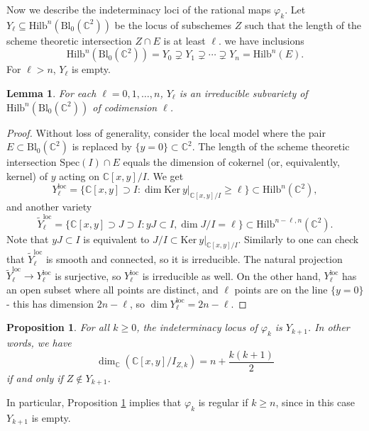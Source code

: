 \documentclass[12pt]{amsart}
\newcommand{\Hilb}{\mathrm{Hilb}}
\newcommand{\C}{\mathbb{C}}
\newcommand{\Ker}{\mathrm{Ker}}
\newcommand{\Spec}{\mathrm{Spec}}
\newcommand{\Bl}{\mathrm{Bl}}
\numberwithin{equation}{section}
\newtheorem{proposition}[theorem]{Proposition}
\newtheorem{lemma}[theorem]{Lemma}
\theoremstyle{definition}
\begin{document}
Now we describe the indeterminacy loci of the rational maps $\varphi_k$. Let $Y_\ell\subseteq \Hilb^n(\Bl_0 (\C^2))$ be the locus of subschemes $Z$ such that the length of the scheme theoretic intersection $Z\cap E$ is at least $\ell$. we have inclusions 
\[\Hilb^n(\Bl_0 (\C^2)) = Y_0\supsetneq Y_1 \supsetneq \cdots \supsetneq Y_n = \Hilb^n(E). \]
For $\ell>n$, $Y_\ell$ is empty.

\begin{lemma}
\label{lem: Yl irreducble}
For each $\ell=0,1,\dots,n$, $Y_\ell$ is an irreducible  subvariety of $\Hilb^n(\Bl_0 (\C^2))$ of codimension $\ell$.
\end{lemma}

\begin{proof}
Without loss of generality, consider the local model where the pair $E\subset \Bl_0 (\C^2)$ is replaced by $\{y=0\}\subset \C^2$. The length of the scheme theoretic intersection $\Spec(I)\cap E$ equals the dimension of cokernel (or, equivalently, kernel) of $y$ acting on $\C[x,y]/I$. We get 
$$
Y_{\ell}^{\mathrm{loc}}=\{\C[x,y]\supset I: \dim \Ker\  y|_{\C[x,y]/I}\ge \ell\}\subset \Hilb^n(\C^2),
$$
and another variety 
$$
\widetilde{Y}_{\ell}^{\mathrm{loc}}=\{\C[x,y]\supset J\supset I: yJ\subset I,\dim J/I=\ell\}\subset \Hilb^{n-\ell,n}(\C^2).
$$
Note that $yJ\subset I$ is equivalent to $J/I\subset \Ker\  y|_{\C[x,y]/I}$.
Similarly to \cite[Theorem 4.1.6]{CGM} one can check that $\widetilde{Y}_{\ell}^{\mathrm{loc}}$ is smooth and connected, so it is irreducible. The natural projection $\widetilde{Y}_{\ell}^{\mathrm{loc}}\to Y_{\ell}^{\mathrm{loc}}$
is surjective, 
so $Y_{\ell}^{\mathrm{loc}}$ is irreducible as well. On the other hand,  $Y_{\ell}^{\mathrm{loc}}$ has an open subset where all points are distinct, and $\ell$ points are on the line $\{y=0\}$ - this has dimension $2n-\ell$, so $\dim Y_{\ell}^{\mathrm{loc}}=2n-\ell$.
\end{proof}


\begin{proposition}\label{prop:ind locus}
    For all $k\geq 0$, the indeterminacy locus of $\varphi_k$ is $Y_{k+1}$. In other words, we have
    \[ \dim_{\C}\left(\C[x,y]/I_{Z,k}\right) = n + \frac{k(k+1)}2 \]
    if and only if $Z\notin Y_{k+1}$.
\end{proposition}

In particular, Proposition \ref{prop:ind locus} implies that $\varphi_k$ is regular if $k\geq n$, since in this case $Y_{k+1}$ is empty.
\end{document}
